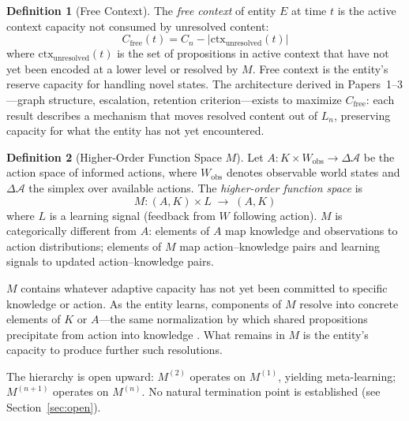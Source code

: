 \documentclass[11pt]{article}
\theoremstyle{definition}
\newtheorem{definition}{Definition}
\theoremstyle{remark}
\begin{document}
\begin{definition}[Free Context]
\label{def:free}
The \emph{free context} of entity $E$ at time $t$ is the active context
capacity not consumed by unresolved content:
\[
C_{\mathrm{free}}(t) = C_n - |\mathrm{ctx}_{\mathrm{unresolved}}(t)|
\]
where $\mathrm{ctx}_{\mathrm{unresolved}}(t)$ is the set of
propositions in active context that have not yet been encoded at a lower
level or resolved by $M$. Free context is the entity's reserve capacity
for handling novel states. The architecture derived in
Papers~1--3---graph structure, escalation, retention criterion---exists
to maximize $C_{\mathrm{free}}$: each result describes a mechanism that
moves resolved content out of $L_n$, preserving capacity for what the
entity has not yet encountered.
\end{definition}

\begin{definition}[Higher-Order Function Space $M$]
\label{def:M}
Let $A : K \times W_{\mathrm{obs}} \to \Delta \mathcal{A}$ be the
action space of informed actions, where $W_{\mathrm{obs}}$ denotes
observable world states and $\Delta \mathcal{A}$ the simplex over
available actions. The \emph{higher-order function space} is
\[
M : (A, K) \times L \;\to\; (A, K)
\]
where $L$ is a learning signal (feedback from $W$ following action).
$M$ is categorically different from $A$: elements of $A$ map knowledge
and observations to action distributions; elements of $M$ map
action--knowledge pairs and learning signals to updated
action--knowledge pairs.

$M$ contains whatever adaptive capacity has not yet been committed to
specific knowledge or action. As the entity learns, components of $M$
resolve into concrete elements of $K$ or $A$---the same normalization
by which shared propositions precipitate from action into knowledge
\cite{McCarthy2026c}. What remains in $M$ is the entity's capacity
to produce further such resolutions.

The hierarchy is open upward: $M^{(2)}$ operates on $M^{(1)}$, yielding
meta-learning; $M^{(n+1)}$ operates on $M^{(n)}$. No natural
termination point is established (see Section~\ref{sec:open}).
\end{definition}
\end{document}
